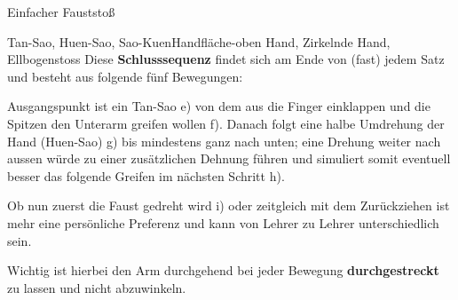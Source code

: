 \begin{WTSatz}{Einfacher Fauststo{\ss}}
\begin{WTSatzTeil}{Tan-Sao, Huen-Sao, Sao-Kuen}{Handfl\"ache-oben Hand, Zirkelnde Hand, Ellbogenstoss}
		Diese \textbf{Schlusssequenz} findet sich am Ende von (fast) jedem Satz und besteht aus folgende f\"unf Bewegungen:
		
		
		
		
		Ausgangspunkt ist ein Tan-Sao e) von dem aus die Finger einklappen und die Spitzen den Unterarm greifen wollen f). Danach folgt eine halbe Umdrehung der Hand (Huen-Sao) g) bis mindestens ganz nach unten; eine Drehung weiter nach aussen w\"urde zu einer zus\"atzlichen Dehnung f\"uhren und simuliert somit eventuell besser das folgende Greifen im n\"achsten Schritt h).
		
		
		Ob nun zuerst die Faust gedreht wird i) oder zeitgleich mit dem Zur\"uckziehen ist mehr eine pers\"onliche Preferenz und kann von Lehrer zu Lehrer unterschiedlich sein.
		
		Wichtig ist hierbei den Arm durchgehend bei jeder Bewegung \textbf{durchgestreckt} zu lassen und nicht abzuwinkeln.
		
	\end{WTSatzTeil}
\end{WTSatz}


